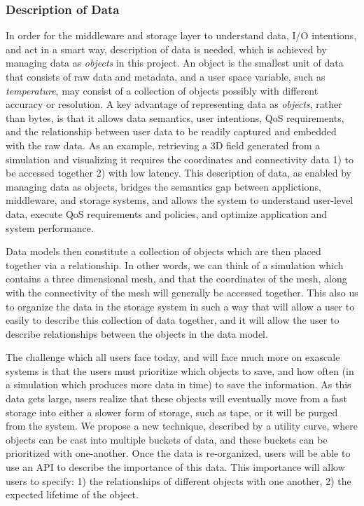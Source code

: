 \subsubsection{Description of Data}
In order for the middleware and storage layer to understand data,
I/O intentions, and act in a smart way, description of data is needed,
which is achieved by managing data as \textit{objects} in this project.
An object is the smallest unit of data that consists of raw data and metadata,
and a user space variable, such as \textit{temperature}, may consist of a collection
of objects possibly with different accuracy or resolution.
A key advantage of representing data as \textit{objects}, rather than 
bytes, is that it allows data semantics, user intentions, QoS requirements, and
the relationship between user data to be readily captured and embedded with the 
raw data. As an example, retrieving a 3D field generated from a simulation and visualizing it
requires the coordinates and connectivity data 1) to be accessed together 2) with low
latency. This description of data, as enabled by managing data as objects, bridges 
the semantics gap between applictions, middleware, and storage systems,
and allows the system to understand user-level data, execute QoS requirements and policies, and
optimize application and system performance.

Data models then constitute a collection
of objects which are then placed together via a relationship. In other words, we can think of a
simulation which contains a three dimensional mesh, and that the coordinates of the mesh, along
with the connectivity of the mesh will generally be accessed together. This also us to organize
the data in the storage system in such a way that will allow a user to easily to describe this 
collection of data together, and it will allow the user to describe relationships between the objects
in the data model. 

The challenge which all users face today, and will face much more on exascale systems is that 
the users must prioritize which objects to save, and how often (in a simulation which produces more
data in time)  to save the information. As this data gets large,  users realize that these objects will
eventually move from a fast storage into either a slower form of storage, such as tape, or it will be
purged from the system.  We propose a new technique, described by a utility curve, where objects
can be cast into multiple buckets of data, and these buckets can be prioritized with one-another.
Once the data is re-organized, users will be able to use an API to describe the importance of this data.
This importance will allow users to specify: 1) the relationships of different objects with one another,
2) the expected lifetime of the object.

